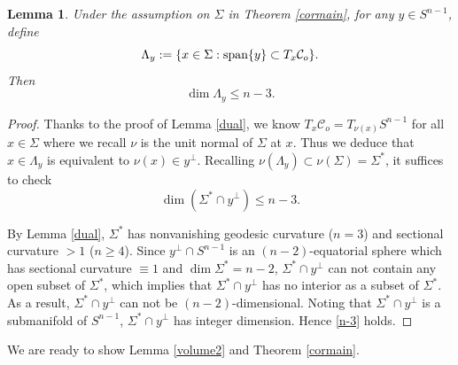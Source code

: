 \documentclass[11pt,a4paper,reqno]{amsart}
\newcommand{\calC}{\mathcal{C}}
\newcommand{\1}{\mathbf{1}}
\numberwithin{equation}{section}
\theoremstyle{plain}
\newtheorem{lemma}[equation]{Lemma}
\theoremstyle{definition}
\theoremstyle{remark}
\begin{document}
\begin{lemma} \label{Lambda}
    Under the assumption on $\Sigma$ in Theorem \ref{cormain}, for any $y \in S^{n-1}$, define
    $$  \Lambda_y:=  \{x \in \Sigma : \mbox{\rm span}\{y\} \subset T_x\calC_o\}.  $$
    Then
    $$  \dim \Lambda_y \le n-3.  $$
\end{lemma}

\begin{proof}
    Thanks to the proof of Lemma \ref{dual}, we know $T_x\calC_o = T_{\nu(x)} S^{n-1}$ for all $x \in \Sigma$ where we recall $\nu$ is the unit normal of $\Sigma$ at $x$. Thus we deduce that $x \in \Lambda_y$ is equivalent to $\nu(x) \in y^\perp$. Recalling $\nu(\Lambda_y) \subset \nu(\Sigma) = \Sigma^\ast$,
it suffices to check
\begin{equation}\label{n-3}
   \dim (\Sigma^\ast \cap   y^\perp)  \le n-3.
\end{equation}


    By Lemma \ref{dual}, $\Sigma^\ast$ has nonvanishing geodesic curvature ($n=3$) and sectional curvature $> 1$ ($n \ge 4$).
    Since $y^\perp \cap S^{n-1}$ is an $(n-2)$-equatorial sphere which has sectional curvature $\equiv 1$ and $\dim \Sigma^\ast= n-2$, $\Sigma^\ast \cap y^\perp$ can not contain any open subset of $\Sigma^\ast$, which implies that $\Sigma^\ast \cap y^\perp$ has no interior as a subset of $\Sigma^\ast$. As a result,
    $\Sigma^\ast \cap y^\perp$ can not be $(n-2)$-dimensional. Noting that $\Sigma^\ast \cap   y^\perp$ is a submanifold of $S^{n-1}$, $\Sigma^\ast \cap   y^\perp$ has integer dimension. Hence \eqref{n-3} holds.
\end{proof}


We are ready to show Lemma \ref{volume2} and Theorem \ref{cormain}.
\end{document}
